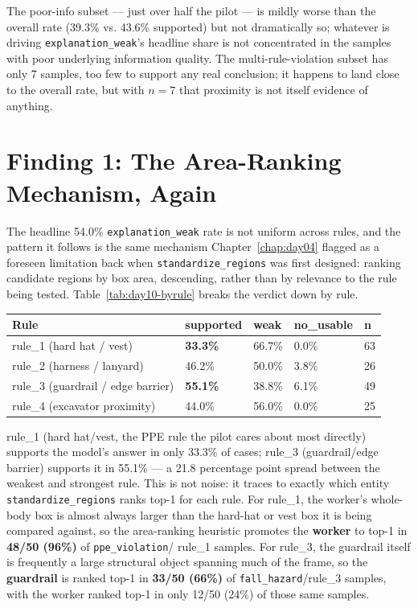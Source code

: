 The poor-info subset --- just over half the pilot --- is mildly worse than the overall rate (39.3\% vs.
43.6\% supported) but not dramatically so; whatever is driving \texttt{explanation\_weak}'s headline
share is not concentrated in the samples with poor underlying information quality. The
multi-rule-violation subset has only 7 samples, too few to support any real conclusion; it happens to
land close to the overall rate, but with $n=7$ that proximity is not itself evidence of anything.

\section{Finding 1: The Area-Ranking Mechanism, Again}

The headline 54.0\% \texttt{explanation\_weak} rate is not uniform across rules, and the pattern it
follows is the same mechanism Chapter~\ref{chap:day04} flagged as a foreseen limitation back when
\texttt{standardize\_regions} was first designed: ranking candidate regions by box area, descending,
rather than by relevance to the rule being tested. Table~\ref{tab:day10-byrule} breaks the verdict down
by rule.

\begin{center}
\begin{tabular}{p{5.0cm}p{2.0cm}p{1.6cm}p{1.9cm}p{1.1cm}}
\toprule
\textbf{Rule} & \textbf{supported} & \textbf{weak} & \textbf{no\_\allowbreak usable} & \textbf{n} \\
\midrule
rule\_1 (hard hat / vest) & \textbf{33.3\%} & 66.7\% & 0.0\% & 63 \\
rule\_2 (harness / lanyard) & 46.2\% & 50.0\% & 3.8\% & 26 \\
rule\_3 (guardrail / edge barrier) & \textbf{55.1\%} & 38.8\% & 6.1\% & 49 \\
rule\_4 (excavator proximity) & 44.0\% & 56.0\% & 0.0\% & 25 \\
\bottomrule
\end{tabular}
\label{tab:day10-byrule}
\end{center}

rule\_1 (hard hat/vest, the PPE rule the pilot cares about most directly) supports the model's answer
in only 33.3\% of cases; rule\_3 (guardrail/edge barrier) supports it in 55.1\% --- a 21.8 percentage
point spread between the weakest and strongest rule. This is not noise: it traces to exactly which
entity \texttt{standardize\_regions} ranks top-1 for each rule. For rule\_1, the worker's whole-body box
is almost always larger than the hard-hat or vest box it is being compared against, so the area-ranking
heuristic promotes the \textbf{worker} to top-1 in \textbf{48/50 (96\%)} of \texttt{ppe\_violation}/
rule\_1 samples. For rule\_3, the guardrail itself is frequently a large structural object spanning much
of the frame, so the \textbf{guardrail} is ranked top-1 in \textbf{33/50 (66\%)} of
\texttt{fall\_hazard}/rule\_3 samples, with the worker ranked top-1 in only 12/50 (24\%) of those same
samples.

